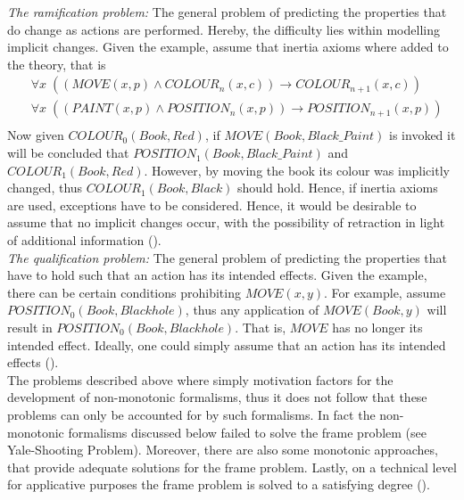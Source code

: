 \documentclass{extarticle}
\begin{document}
\emph{The ramification problem: }  The general problem of predicting the properties that do change as actions are performed. Hereby, the difficulty lies within modelling implicit changes. Given the example, assume that inertia axioms where added to the theory, that is 
\begin{equation*}
\begin{split}
&\forall x \; ((MOVE(x,p) \wedge COLOUR_{n}(x,c)) \to COLOUR_{n+1}(x,c)) \\
&\forall x \; ((PAINT(x,p) \wedge POSITION_{n}(x,p)) \to POSITION_{n+1}(x,p)) \\
\end{split}
\end{equation*} 
Now given $COLOUR_0(Book, Red)$, if $MOVE(Book, Black\_Paint)$ is invoked it will be concluded that \linebreak $POSITION_{1}(Book, Black\_Paint)$ and $COLOUR_1(Book, Red)$. However, by moving the book its colour was implicitly changed, thus $COLOUR_1(Book, Black)$ should hold. Hence, if inertia axioms are used, exceptions have to be considered. Hence, it would be desirable to assume that no implicit changes occur, with the possibility of retraction in light of additional information (\cite{BOCHMAN2007557, ginsberg1987reasoning}). \\

\emph{The qualification problem: }  The general problem of predicting the properties that have to hold such that an action has its intended effects. Given the example, there can be certain conditions prohibiting $MOVE(x,y)$. For example, assume $POSITION_0(Book,  Blackhole)$, thus any application of $MOVE(Book, y)$ will result in $POSITION_0(Book,  Blackhole)$. That is, $MOVE$ has no longer its intended effect. Ideally, one could simply assume that an action has its intended effects
(\cite{ginsberg1987reasoning,BOCHMAN2007557}). \\


The problems described above where simply motivation factors for the development of non-monotonic formalisms, thus it does not follow that these problems can only be accounted for by such formalisms. In fact the non-monotonic formalisms discussed below failed to solve the frame problem (see Yale-Shooting Problem). Moreover, there are also some monotonic approaches, that provide adequate solutions for the frame problem. Lastly, on a technical level for applicative purposes the frame problem is solved to a satisfying degree (\cite{stanford2016frame}). \\
\end{document}
